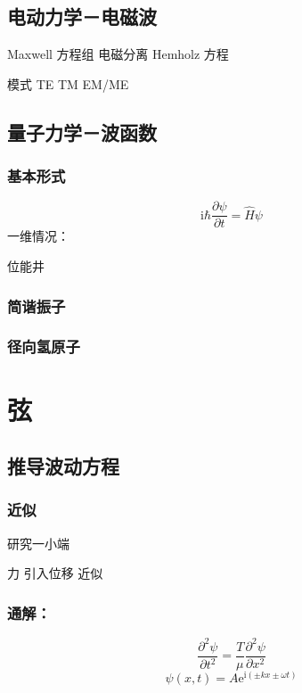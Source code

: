 \documentclass[11pt]{book}
\begin{document}
\chapter{电动力学－电磁波}
\label{sec:orgaf18689}
Maxwell 方程组
电磁分离 Hemholz 方程

模式
TE
TM
EM/ME
\chapter{量子力学－波函数}
\label{sec:org61ef059}
\section{基本形式}
\label{sec:org7435e45}
\begin{equation}
\label{eq:40}
\mathrm{i}\hbar \frac{\partial \psi}{\partial t}=\hat{H}\psi
\end{equation}
一维情况：

位能井
\section{简谐振子}
\label{sec:orgc297210}
\section{径向氢原子}
\label{sec:orga7c7b21}

\part{弦}
\label{sec:org43cf2e9}

\chapter{推导波动方程}
\label{sec:org76c24b6}

\section{近似}
\label{sec:orgfc41b62}
研究一小端

力
引入位移
近似

\section{通解：}
\label{sec:org7568e73}
\begin{equation}
\label{eq:43}
\frac{\partial^{2} \psi}{\partial t^2}=\frac{T}{\mu}\frac{\partial^2 \psi}{\partial x^2}
\end{equation}
\begin{equation}
\label{eq:44}
\psi(x,t)=A\mathrm{e}^{\mathrm{i}(\pm kx\pm \omega t)}
\end{equation}
\end{document}
